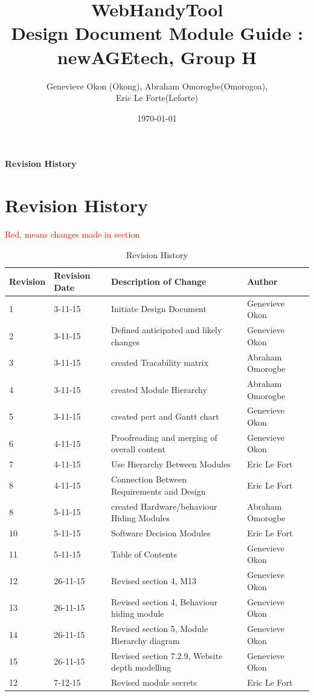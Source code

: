 \documentclass[titlepage]{article}
\begin{document}
\title{WebHandyTool \\
 Design Document Module Guide : newAGEtech, Group H }
\author{Genevieve Okon (Okong), Abraham Omorogbe(Omorogoa),\\
 Eric Le Forte(Leforte)}
\date{\today}
\maketitle


\tableofcontents
\listoffigures
\listoftables

\textbf{Revision History} \\ \normalsize
\pagebreak

\section{Revision History}
\textcolor{red}{Red, means changes made in section}
\begin{table}[h!]
	\begin{tabular}{| p{5cm} | p{5cm} | p{5cm} |p{5cm} |}    \hline
Revision  &Revision Date &Description of Change &Author\\ \hline
1& 3-11-15& Initiate Design Document&Genevieve Okon\\ \hline
2& 3-11-15& Defined anticipated and likely changes&Genevieve Okon\\ \hline
3& 3-11-15& created Tracability matrix &Abraham Omorogbe\\ \hline
4& 3-11-15& created  Module Hierarchy&Abraham Omorogbe\\ \hline
5& 3-11-15&created pert and Gantt chart&Genevieve Okon\\ \hline
6& 4-11-15& Proofreading and merging of overall content&Genevieve Okon\\ \hline
7& 4-11-15& Use Hierarchy Between Modules&Eric Le Fort\\ \hline
8& 4-11-15&Connection Between Requirements and Design&Eric Le Fort\\ \hline
8& 5-11-15& created Hardware/behaviour Hiding Modules&Abraham Omorogbe\\ \hline
10& 5-11-15& Software Decision Modules&Eric Le Fort\\ \hline
11& 5-11-15& Table of Contents&Genevieve Okon\\ \hline


12& 26-11-15&Revised section 4, M13&Genevieve Okon\\ \hline
13& 26-11-15&Revised section 4, Behaviour hiding module&Genevieve Okon\\ \hline
14& 26-11-15&Revised section 5, Module Hierarchy diagram&Genevieve Okon\\ \hline
15& 26-11-15&Revised section 7.2.9, Website depth modelling&Genevieve Okon\\ \hline
12& 7-12-15& Revised module secrets& Eric Le Fort \\ \hline
       \end{tabular}
       
       \caption{Revision History}
       \label{table:Revision History}
\end{table}
\end{document}
